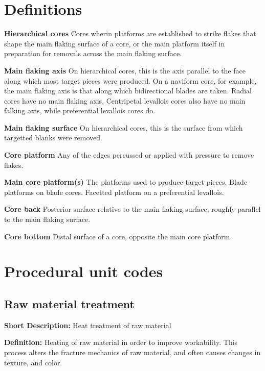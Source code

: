 \documentclass[
]{article}
\begin{document}
\hypertarget{definitions}{%
\section{Definitions}\label{definitions}}

\textbf{Hierarchical cores} Cores wherin platforms are established to
strike flakes that shape the main flaking surface of a core, or the main
platform itself in preparation for removals across the main flaking
surface.

\textbf{Main flaking axis} On hierarchical cores, this is the axis
parallel to the face along which most target pieces were produced. On a
naviform core, for example, the main flaking axis is that along which
bidirectional blades are taken. Radial cores have no main flaking axis.
Centripetal levallois cores also have no main falking axis, while
preferential levallois cores do.

\textbf{Main flaking surface} On hierarchical cores, this is the surface
from which targetted blanks were removed.

\textbf{Core platform} Any of the edges percussed or applied with
pressure to remove flakes.

\textbf{Main core platform(s)} The platforms used to produce target
pieces. Blade platforms on blade cores. Facetted platform on a
preferential levallois.

\textbf{Core back} Posterior surface relative to the main flaking
surface, roughly parallel to the main flaking surface.

\textbf{Core bottom} Distal surface of a core, opposite the main core
platform.

\hypertarget{procedural-unit-codes}{%
\section{Procedural unit codes}\label{procedural-unit-codes}}

\hypertarget{raw-material-treatment}{%
\subsection{Raw material treatment}\label{raw-material-treatment}}

\textbf{Short Description:} Heat treatment of raw material

\textbf{Definition:} Heating of raw material in order to improve
workability. This process alters the fracture mechanics of raw material,
and often causes changes in texture, and color.
\end{document}

